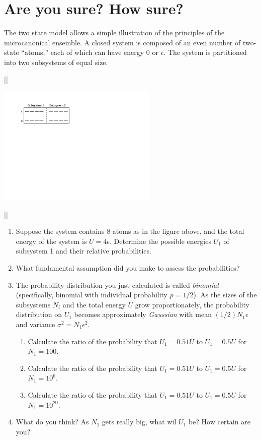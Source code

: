 \documentclass[11pt]{article}
\begin{document}
\section{Are you sure? How sure?}
\label{sec:orgdde3285}
The two state model allows a simple illustration
  of the principles of the microcanonical ensemble. A closed system is composed of an even
  number of two-state ``atoms,'' each of which can have energy 0 or \(\epsilon\).  The
  system is partitioned into two subsystems of equal size.

[[\begin{center}
\includegraphics[width=3in]{./figs/Two-state.pdf}
\end{center}]]

\begin{enumerate}
\item Suppose the system contains 8 atoms as in the figure above, and the total energy of
the system is \(U = 4\epsilon\).  Determine the possible energies \(U_1\) of subsystem 1 and
their relative probabilities.
\item What fundamental assumption did you make to assess the probabilities?

\item The probability distribution you just calculated is called \emph{binomial}
(specifically, binomial with individual probability \(p=1/2\)).  As the sizes of
the subsystems \(N_i\) and the total energy \(U\) grow proportionately, the
probability distribution on \(U_1\) becomes approximately \emph{Gaussian} with mean
\((1/2) N_1\epsilon\) and variance \(\sigma^2 = N_1\epsilon^2\).

\begin{enumerate}
\item Calculate the ratio of the probability that \(U_1=0.51 U\) to \(U_1=0.5 U\) for \(N_1 = 100\).
\item Calculate the ratio of the probability that \(U_1=0.51 U\) to \(U_1=0.5 U\) for \(N_1 = 10^6\).
\item Calculate the ratio of the probability that \(U_1=0.51 U\) to \(U_1=0.5 U\) for \(N_1 = 10^{20}\).
\end{enumerate}

\item What do you think? As \(N_1\) gets really big, what wil \(U_1\) be?  How certain are you?
\end{enumerate}
\end{document}
